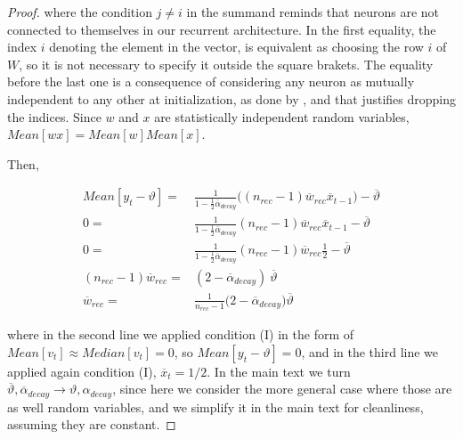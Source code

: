 \begin{proof}
\noindent where the condition $j\neq i$ in the summand reminds that neurons are not connected to themselves in our recurrent architecture. In the first equality, the index $i$ denoting the element in the vector, is equivalent as choosing the row $i$ of $W$, so it is not necessary to specify it outside the square brakets. The equality before the last one is a consequence of considering any neuron as mutually independent to any other at initialization, as done by \cite{glorot2010understanding, he2015delving}, and that justifies dropping the indices. Since $w$ and $x$ are statistically independent random variables, $Mean[ wx]=Mean[ w]Mean[ x]$.


Then, 

\begin{align}
    Mean[y_t-\vartheta] =&
    \frac{1 }{1-\frac{1}{2}\overline{\alpha}_{decay}} \Big((n_{rec}-1)\overline{w}_{rec}\overline{x}_{t-1}\Big) - \overline{\vartheta}\\
    0=&
    \frac{1 }{1-\frac{1}{2}\overline{\alpha}_{decay}} (n_{rec}-1)\overline{w}_{rec}\overline{x}_{t-1} - \overline{\vartheta}\\
    0=&
    \frac{1}{1-\frac{1}{2}\overline{\alpha}_{decay}} (n_{rec}-1)\overline{w}_{rec}\frac{1}{2} - \overline{\vartheta}\\
    (n_{rec}-1)\overline{w}_{rec}=&
    (2-\overline{\alpha}_{decay})\ \overline{\vartheta}\\
    \overline{w}_{rec}=&
    \frac{1}{n_{rec}-1}\Big(2-\overline{\alpha}_{decay}\Big)\overline{\vartheta} \label{appeq:CI}
\end{align}

\noindent where in the second line we applied condition (I) in the form of $Mean[v_t]\approx Median[v_t]=0$, so $Mean[y_t-\vartheta]=0$, and in the third line we applied again condition (I), $\overline{x}_t=1/2$.
In the main text we turn $\overline{\vartheta}, \overline{\alpha}_{decay}\rightarrow \vartheta, \alpha_{decay}$, since here we consider the more general case where those are as well random variables, and we simplify it in the main text for cleanliness, assuming they are constant.

\end{proof}

